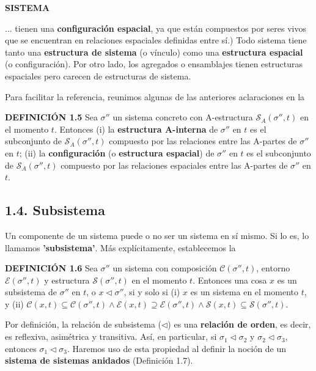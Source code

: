 \fancyhf{}
\fancyhead[r]{\thepage} 
\begin{center}
{\fontsize{13}{16}\selectfont \textbf{SISTEMA}}
\end{center}
\vspace{0.5cm}

{\fontsize{13}{15}\selectfont
... tienen una \textbf{configuración espacial}, ya que están compuestos por seres vivos que se encuentran en relaciones espaciales definidas entre sí.) Todo sistema tiene tanto una \textbf{estructura de sistema} (o vínculo) como una \textbf{estructura espacial} (o configuración). Por otro lado, los agregados o ensamblajes tienen estructuras espaciales pero carecen de estructuras de sistema.

Para facilitar la referencia, reunimos algunas de las anteriores aclaraciones en la

\textbf{DEFINICIÓN 1.5} Sea $\sigma''$ un sistema concreto con A-estructura $\mathcal{S}_A(\sigma'', t)$ en el momento $t$. Entonces
(i) la \textbf{estructura A-interna} de $\sigma''$ en $t$ es el subconjunto de $\mathcal{S}_A(\sigma'', t)$ compuesto por las relaciones entre las A-partes de $\sigma''$ en $t$;
(ii) la \textbf{configuración} (o \textbf{estructura espacial}) de $\sigma''$ en $t$ es el subconjunto de $\mathcal{S}_A(\sigma'', t)$ compuesto por las relaciones espaciales entre las A-partes de $\sigma''$ en $t$.

\subsection*{1.4. Subsistema}
Un componente de un sistema puede o no ser un sistema en sí mismo. Si lo es, lo llamamos \textbf{'subsistema'}. Más explícitamente, establecemos la

\textbf{DEFINICIÓN 1.6} Sea $\sigma''$ un sistema con composición $\mathcal{C}(\sigma'', t)$, entorno $\mathcal{E}(\sigma'', t)$ y estructura $\mathcal{S}(\sigma'', t)$ en el momento $t$. Entonces una cosa $x$ es un subsistema de $\sigma''$ en $t$, o $x \triangleleft \sigma''$, si y solo si
(i) $x$ es un sistema en el momento $t$, y
(ii) $\mathcal{C}(x, t) \subseteq \mathcal{C}(\sigma'', t) \land \mathcal{E}(x, t) \supseteq \mathcal{E}(\sigma'', t) \land \mathcal{S}(x, t) \subseteq \mathcal{S}(\sigma'', t)$.

Por definición, la relación de subsistema ($\triangleleft$) es una \textbf{relación de orden}, es decir, es reflexiva, asimétrica y transitiva. Así, en particular, si $\sigma_1 \triangleleft \sigma_2$ y $\sigma_2 \triangleleft \sigma_3$, entonces $\sigma_1 \triangleleft \sigma_3$. Haremos uso de esta propiedad al definir la noción de un \textbf{sistema de sistemas anidados} (Definición 1.7).

}
